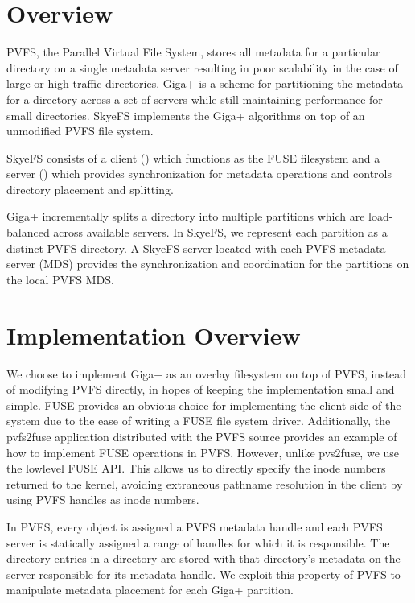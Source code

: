 \documentclass[onecolumn, 11pt, letterpaper]{article}
\begin{document}
\maketitle

\parindent 0.3in

\section{Overview}
PVFS, the Parallel Virtual File System, stores all metadata for a particular
directory on a single metadata server\cite{pvfs} resulting in poor scalability in the case
of large or high traffic directories.  Giga+ is a scheme for partitioning the
metadata for a directory across a set of servers while still maintaining
performance for small directories.\cite{gigaplus}  SkyeFS implements the Giga+ algorithms on
top of an unmodified PVFS file system.

SkyeFS consists of a client () which functions as the
FUSE filesystem and a server () which provides
synchronization for metadata operations and controls directory placement and
splitting.\cite{fuse}  

Giga+ incrementally splits a directory into multiple partitions which are
load-balanced across available servers.  In SkyeFS, we represent each
partition as a distinct PVFS directory.  A SkyeFS server located with each
PVFS metadata server (MDS) provides the synchronization and coordination for
the partitions on the local PVFS MDS. 

\section{Implementation Overview}
We choose to implement Giga+ as an overlay filesystem on top of PVFS, instead
of modifying PVFS directly, in hopes of keeping the implementation small and
simple.  FUSE provides an obvious choice for implementing the client side of
the system due to the ease of writing a FUSE file system driver.
Additionally, the pvfs2\-fuse application distributed with the PVFS source
provides an example of how to implement FUSE operations in PVFS.  However,
unlike pvs2\-fuse, we use the lowlevel FUSE API.  This allows us to directly
specify the inode numbers returned to the kernel, avoiding extraneous pathname
resolution in the client by using PVFS handles as inode numbers.

In PVFS, every object is assigned a PVFS metadata handle and each PVFS server
is statically assigned a range of handles for which it is responsible.  
The directory entries in a directory are stored with that directory's metadata
on the server responsible for its metadata handle.  We exploit this property
of PVFS to manipulate metadata placement for each Giga+ partition.
\end{document}

